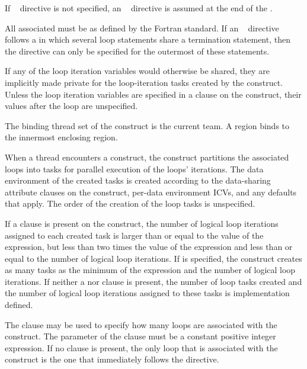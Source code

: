 If ~ directive is not specified, an ~ directive is assumed at the end of the .

All associated  must be  as defined by the Fortran standard. If an ~ directive follows a  in which several loop statements share a  termination statement, then the directive can only be specified for the outermost of these  statements.

If any of the loop iteration variables would otherwise be shared, they are implicitly made private for the loop-iteration tasks created by the  construct. Unless the loop iteration variables are specified in a  clause on the  construct, their values after the loop are unspecified.
\fortranspecificend

\binding
The binding thread set of the  construct is the current team. A  region binds to the innermost enclosing  region.

\descr
When a thread encounters a  construct, the construct partitions the associated loops into tasks for parallel execution of the loops' iterations. The data environment of the created tasks is created according to the data-sharing attribute clauses on the  construct, per-data environment ICVs, and any defaults that apply. The order of the creation of the loop tasks is unspecified.

If a  clause is present on the  construct, the number of logical loop iterations assigned to each created task is larger than or equal to the value of the  expression, but less than two times the value of the  expression and less than or equal to the number of logical loop iterations. If  is specified, the  construct creates as many tasks as the minimum of the  expression and the number of logical loop iterations. If neither a  nor  clause is present, the number of loop tasks created and the number of logical loop iterations assigned to these tasks is implementation defined.

The  clause may be used to specify how many loops are associated with the  construct. The parameter of the  clause must be a constant positive integer expression. If no  clause is present, the only loop that is associated with the  construct is the one that immediately follows the  directive.

